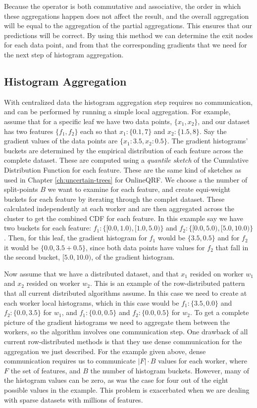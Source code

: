 Because the \AND operator is both commutative and associative, the order in which
these aggregations happen does not affect the result, and the overall aggregation
will be equal to the aggregation of the partial aggregations. This ensures that
our predictions will be correct. By using this method we can determine the exit
nodes for each data point, and from that the corresponding gradients that we need
for the next step of histogram aggregation.

\subsection{Histogram Aggregation}
\label{subsec:block-gbt-histogram-aggregation}


With centralized data the histogram aggregation step requires no communication,
and can be performed by running a simple local aggregation.
For example, assume that for a specific leaf we have two data points, $\{x_1, x_2\}$,
and our dataset has two features $\{f_1, f_2\}$ each so that $x_1: \{0.1, 7\}$ and $x_2: \{1.5, 8\}$.
Say the gradient values of the data points are $\{x_1: 3.5, x_2: 0.5\}$.
The gradient histograms' buckets are determined by the empirical distribution of each
feature across the complete dataset. These are computed using a \emph{quantile sketch}
of the Cumulative Distribution Function for each feature. These are the same kind of sketches
as used in Chapter \ref{ch:uncertain-trees} for OnlineQRF. We choose a the number of split-points
$B$ we want to examine for each feature, and create equi-weight buckets for each feature
by iterating through the complet dataset. These calculated independently at each worker
and are then aggregated across the cluster to get the combined CDF for each feature.
In this example say we have two buckets for each feature:
$f_1: \{[0.0, 1.0), [1.0, 5.0)\}$ and $f_2:\{ [0.0, 5.0), [5.0, 10.0)\}$.
Then, for this leaf, the gradient histogram for $f_1$ would be $\{3.5, 0.5\}$ and for $f_2$
it would be $\{0.0, 3.5 + 0.5\}$, since both data points have values for $f_2$ that fall
in the second bucket, $[5.0, 10.0)$, of the gradient histogram.

Now assume that we have a distributed dataset, and that $x_1$ resided on worker $w_1$ and $x_2$ resided on worker $w_2$. This is
an example of the row-distributed pattern that all current distributed algorithms assume.
In this case we need to create at each worker local histograms, which
in this case would be $f_1: \{3.5, 0.0\}$ and $f_2: \{0.0, 3.5\}$ for $w_1$, and $f_1: \{0.0, 0.5\}$ and $f_2: \{0.0, 0.5\}$ for $w_2$. To get a complete picture of the gradient histograms
we need to aggregate them between the workers, so the algorithm involves one communication
step. One drawback of all current row-distributed methods is that they use dense communication
for the aggregation we just described. For the example given above, dense communication
requires us to communicate $|F| \cdot B$ values for each worker, where $F$ the set of features,
and $B$ the number of histogram buckets. However,
many of the histogram values can be zero, as was the case for four out of the eight possible
values in the example. This problem is exacerbated when we are dealing with sparse
datasets with millions of features.

